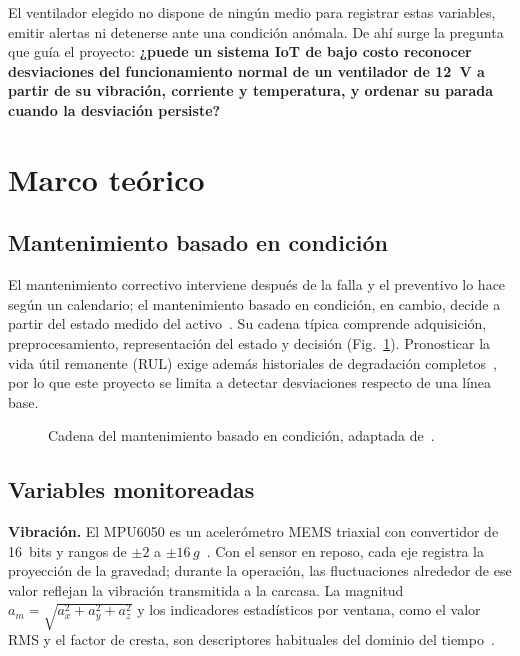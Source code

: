 \documentclass[10pt,twocolumn]{article}
\begin{document}
El ventilador elegido no dispone de ningún medio para registrar estas variables, emitir alertas ni
detenerse ante una condición anómala. De ahí surge la pregunta que guía el proyecto:
\textbf{¿puede un sistema IoT de bajo costo reconocer desviaciones del funcionamiento normal de un
ventilador de 12~V a partir de su vibración, corriente y temperatura, y ordenar su parada cuando
la desviación persiste?}

\section{Marco teórico}

\subsection{Mantenimiento basado en condición}
El mantenimiento correctivo interviene después de la falla y el preventivo lo hace según un
calendario; el mantenimiento basado en condición, en cambio, decide a partir del estado medido del
activo~\cite{lei2018,zhang2019}. Su cadena típica comprende adquisición, preprocesamiento,
representación del estado y decisión (Fig.~\ref{fig:cbm}). Pronosticar la vida útil remanente
(RUL) exige además historiales de degradación completos~\cite{lei2018}, por lo que este proyecto
se limita a detectar desviaciones respecto de una línea base.

\begin{figure}[H]
\centering
{}
\caption{Cadena del mantenimiento basado en condición, adaptada de~\cite{lei2018,zhang2019}.}
\label{fig:cbm}
\end{figure}

\subsection{Variables monitoreadas}

\textbf{Vibración.} El MPU6050 es un acelerómetro MEMS triaxial con convertidor de 16~bits y
rangos de $\pm2$ a $\pm16\,g$~\cite{mpu6050}. Con el sensor en reposo, cada eje registra la
proyección de la gravedad; durante la operación, las fluctuaciones alrededor de ese valor reflejan
la vibración transmitida a la carcasa. La magnitud
$a_m=\sqrt{a_x^2+a_y^2+a_z^2}$ y los indicadores estadísticos por ventana, como el valor RMS y el
factor de cresta, son descriptores habituales del dominio del tiempo~\cite{tiboni2022}.
\end{document}
